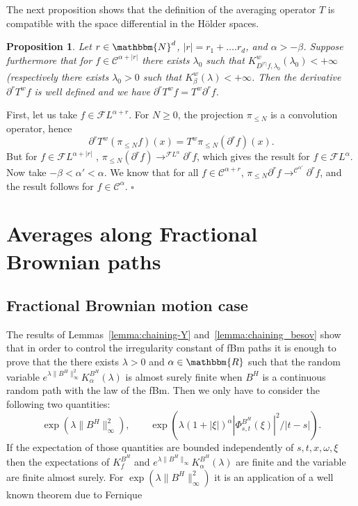 \documentclass[a4paper,11pt]{article}
\newtheorem{proposition}[theorem]{Proposition}
\newenvironment{proof}{{\sc Proof.}}{\hfill$\square$}
\newcommand{\CC}{\mathscr C}
\newcommand{\CF}{\mathscr F}
\begin{document}
The next proposition shows that the definition of the averaging operator $T$
is compatible with the space differential in the Hölder spaces.

\begin{proposition}
  \label{prop:diffenrentiability_averaging_path}Let $r \in \mathbbm{N}^{d}$,
  $| r | =r_{1} + \ldots .r_{d}$, and $\alpha >- \beta$. Suppose furthermore
  that for $f \in \CC^{\alpha + | r |}$ there exists $\lambda_{0}$ such that
  $K^{w}_{D^{| r |} f, \lambda_{0}} ( \lambda_{0} ) <+ \infty$ (respectively
  there exists $\lambda_{0} >0$ such that $K^{w}_{\beta} ( \lambda ) <+
  \infty$. Then the derivative $\partial^{r} T^{w} f$ is well defined and we
  have $\partial^{r} T^{w} f=T^{w} \partial^{r} f$.
\end{proposition}

\begin{proof}
  First, let us take $f \in \CF L^{\alpha +r}$. For $N \geqslant 0$, the
  projection $\pi_{\leqslant N}$ is a convolution operator, hence
  \[ \partial^{r} T^{w} ( \pi_{\leqslant N} f ) ( x ) =T^{w} \pi_{\leqslant N}
     ( \partial^{r} f ) ( x ) . \]
  But for $f \in \CF L^{\alpha + | r |}$ , $\pi_{\leqslant N} ( \partial^{r} f
  ) \rightarrow^{\CF L^{\alpha}} \partial^{r} f$, which gives the result for
  $f \in \CF L^{\alpha}$. Now take $- \beta < \alpha' < \alpha$. We know that
  for all $f \in \CC^{\alpha +r}$, $\pi_{\leqslant N} \partial^{r} f
  \rightarrow^{\CC^{\alpha'}} \partial^{r} f$, and the result follows for $f
  \in \CC^{\alpha}$.
\end{proof}

\section{Averages along Fractional Brownian paths}

\subsection{Fractional Brownian motion case}

The results of Lemmas~\ref{lemma:chaining-Y} and~\ref{lemma:chaining_besov}
show that in order to control the irregularity constant of fBm paths it is
enough to prove that the there exists $\lambda >0$ and $\alpha \in
\mathbbm{R}$ such that the random variable $e^{\lambda \| B^{H}
\|_{\infty}^{2}} K^{B^{H}}_{\alpha} ( \lambda )$ is almost surely finite when
$B^H$ is a continuous random path with the law of the fBm. Then we only have to
consider the following two quantities:
\[ \exp ( \lambda \| B^H \|_{\infty}^{2} ), \qquad
 \exp ( \lambda ( 1+ | \xi | )^{\alpha} | \Phi_{s,t}^{B^H} ( \xi ) |^{2} / |
   t-s | ) . \]
If the expectation of those quantities are bounded independently of $s,t,x,
\omega , \xi$ then the expectations of $K^{B^{H}}_{f}$ and $e^{\lambda \|
B^{H} \|_{\infty}} K^{B^{H}}_{\alpha} ( \lambda )$ are finite and the variable
are finite almost surely. For $\exp ( \lambda \| B^{H} \|_{\infty}^{2} )$ it
is an application of a well known theorem due to Fernique
\end{document}
